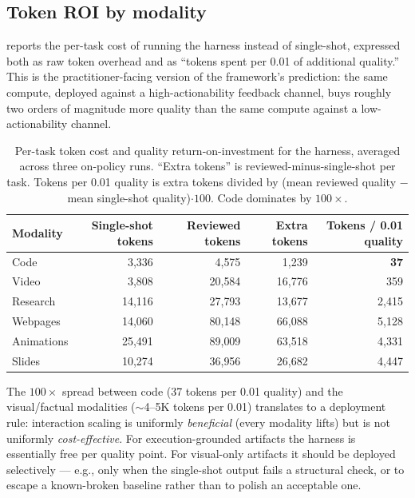 \documentclass[11pt]{article}
\begin{document}
\subsection{Token ROI by modality}
\label{sec:harness-roi}

 reports the per-task cost of running the harness instead of single-shot, expressed both as raw token overhead and as ``tokens spent per 0.01 of additional quality.'' This is the practitioner-facing version of the framework's prediction: the same compute, deployed against a high-actionability feedback channel, buys roughly two orders of magnitude more quality than the same compute against a low-actionability channel.

\begin{table}[ht]
\centering
\caption{Per-task token cost and quality return-on-investment for the harness, averaged across three on-policy runs. ``Extra tokens'' is reviewed-minus-single-shot per task. Tokens per 0.01 quality is extra tokens divided by (mean reviewed quality $-$ mean single-shot quality)$\cdot 100$. Code dominates by $100\times$.}
\label{tab:harness-roi}
\small
\begin{tabular}{lrrrr}
\toprule
Modality & Single-shot tokens & Reviewed tokens & Extra tokens & Tokens / 0.01 quality \\
\midrule
Code        & 3{,}336  & 4{,}575  & 1{,}239  & \textbf{37} \\
Video       & 3{,}808  & 20{,}584 & 16{,}776 & 359 \\
Research    & 14{,}116 & 27{,}793 & 13{,}677 & 2{,}415 \\
Webpages    & 14{,}060 & 80{,}148 & 66{,}088 & 5{,}128 \\
Animations  & 25{,}491 & 89{,}009 & 63{,}518 & 4{,}331 \\
Slides      & 10{,}274 & 36{,}956 & 26{,}682 & 4{,}447 \\
\bottomrule
\end{tabular}
\end{table}

The $100\times$ spread between code (37 tokens per 0.01 quality) and the visual/factual modalities ($\sim$4--5K tokens per 0.01) translates to a deployment rule: interaction scaling is uniformly \emph{beneficial} (every modality lifts) but is not uniformly \emph{cost-effective}. For execution-grounded artifacts the harness is essentially free per quality point. For visual-only artifacts it should be deployed selectively --- e.g., only when the single-shot output fails a structural check, or to escape a known-broken baseline rather than to polish an acceptable one.
\end{document}
